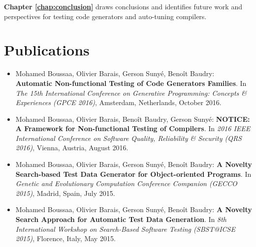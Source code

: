 \textbf{Chapter \ref{chap:conclusion}} draws conclusions and identifies future work and perspectives for testing code generators and auto-tuning compilers.

\section{Publications}

\begin{itemize}
	
	\item Mohamed Boussaa, Olivier Barais, Gerson Suny\'e, Beno\^it Baudry:
	\textbf{Automatic Non-functional Testing of Code Generators Families}. In
	\textit{The 15th International Conference on Generative Programming: Concepts \& Experiences (GPCE 2016)},
	Amsterdam, Netherlands, October 2016.

	\item Mohamed Boussaa, Olivier Barais, Beno\^it Baudry, Gerson Suny\'e:
	\textbf{NOTICE: A Framework for Non-functional Testing of Compilers}. In 
	\textit{2016 IEEE International Conference on Software Quality, Reliability \& Security (QRS 2016)}, Vienna, Austria, August 2016.
	
	\item Mohamed Boussaa, Olivier Barais, Gerson Suny\'e, Beno\^it Baudry:
	\textbf{A Novelty Search-based Test Data Generator for Object-oriented Programs}. In 
	\textit{Genetic and Evolutionary Computation Conference Companion (GECCO 2015)}, 
	Madrid, Spain, July 2015.
	
	\item Mohamed Boussaa, Olivier Barais, Gerson Suny\'e, Beno\^it Baudry:
	\textbf{A Novelty Search Approach for Automatic Test Data Generation}. In
	\textit{8th International Workshop on Search-Based Software Testing (SBST@ICSE 2015)}, 
	Florence, Italy, May 2015.

	
	
\end{itemize}


